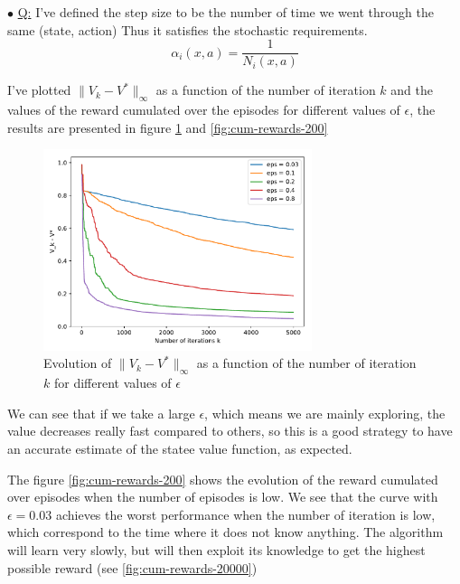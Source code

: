 \documentclass[a4paper, 11pt]{article}
\newcounter{cquestion}
\renewcommand{\thecquestion}{\arabic{cquestion}}
\newenvironment{question}
{\par \vspace{0.5em} \noindent \stepcounter{cquestion} \hspace{-1em}
 $\bullet$ \underline{Q\thecquestion :}}
{}
\newcommand{\norm}[1]{\|#1\|}
\begin{document}
\begin{question}
  I've defined the step size to be the number of time we went through
  the same (state, action) Thus it satisfies the stochastic
  requirements.
  \begin{equation*}
    \alpha_i(x, a) = \dfrac{1}{N_i(x, a)}
  \end{equation*}

  I've plotted $\norm{V_k - V^*}_{\infty}$ as a function of the number
  of iteration $k$ and the values of the reward cumulated over the
  episodes for different values of $\epsilon$, the results are
  presented in figure \ref{fig:comp-eps-5000} and \ref{fig:cum-rewards-200}

  \begin{figure}[h]
    \centering
    \includegraphics[width=0.7\textwidth]{comp_eps_5000}
    \caption{Evolution of $\norm{V_k - V^*}_{\infty}$ as a function of
      the number of iteration $k$ for different values of
      $\epsilon$}\label{fig:comp-eps-5000}
  \end{figure}

  We can see that if we take a large $\epsilon$, which means we are
  mainly exploring, the value decreases really fast compared to
  others, so this is a good strategy to have an accurate estimate of
  the statee value function, as expected. %

  The figure \ref{fig:cum-rewards-200} shows the evolution of the
  reward cumulated over episodes when the number of episodes is low.
  We see that the curve with $\epsilon = 0.03$ achieves the worst
  performance when the number of iteration is low, which correspond to
  the time where it does not know anything. The algorithm will learn
  very slowly, but will then exploit its knowledge to get the highest
  possible reward (see \ref{fig:cum-rewards-20000})


\end{question}
\end{document}
